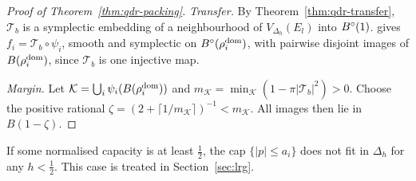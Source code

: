 \begin{proof}[Proof of Theorem~\ref{thm:qdr-packing}]
\emph{Transfer.} By Theorem~\ref{thm:qdr-transfer}, $\mathcal T_b$ is a symplectic embedding of a neighbourhood of
$V_{\Delta_h}(E_l)$ into $B^{\circ}(1)$.  gives
$f_i=\mathcal T_b\circ\psi_i$, smooth and symplectic on $B^{\circ}(\rho_i^{\rm dom})$,
with pairwise disjoint images of $B(\rho_i^{\rm dom})$, since $\mathcal T_b$ is one injective map.

\emph{Margin.} Let $\mathcal K=\bigcup_i\psi_i(B(\rho_i^{\rm dom}))$ and
$m_{\mathcal K}=\min_{\mathcal K}(1-\pi|\mathcal T_b|^2)>0$.
Choose the positive rational $\zeta=(2+\lceil1/m_{\mathcal K}\rceil)^{-1}<m_{\mathcal K}$.
All images then lie in $B(1-\zeta)$.
\end{proof}

If some normalised capacity is at least $\frac12$, the cap $\{|p|\le a_i\}$ does not fit in $\Delta_h$ for any
$h<\frac12$. This case is treated in Section~\ref{sec:lrg}.
